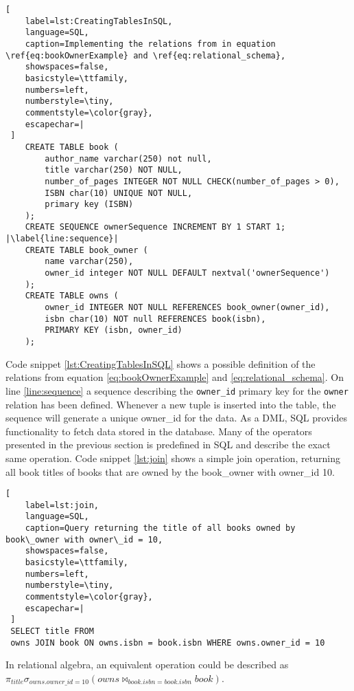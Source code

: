 \begin{lstlisting}[
    label=lst:CreatingTablesInSQL,
    language=SQL,
    caption=Implementing the relations from in equation \ref{eq:bookOwnerExample} and \ref{eq:relational_schema},
    showspaces=false,
    basicstyle=\ttfamily,
    numbers=left,
    numberstyle=\tiny,
    commentstyle=\color{gray},
    escapechar=|
 ]
    CREATE TABLE book (
        author_name varchar(250) not null,
        title varchar(250) NOT NULL,
        number_of_pages INTEGER NOT NULL CHECK(number_of_pages > 0),
        ISBN char(10) UNIQUE NOT NULL,
        primary key (ISBN)
    );
    CREATE SEQUENCE ownerSequence INCREMENT BY 1 START 1; |\label{line:sequence}|
    CREATE TABLE book_owner (
        name varchar(250),
        owner_id integer NOT NULL DEFAULT nextval('ownerSequence')
    );
    CREATE TABLE owns (
        owner_id INTEGER NOT NULL REFERENCES book_owner(owner_id),
        isbn char(10) NOT null REFERENCES book(isbn),
        PRIMARY KEY (isbn, owner_id)
    );
\end{lstlisting}

Code snippet \ref{lst:CreatingTablesInSQL} shows a possible definition of the relations from equation \ref{eq:bookOwnerExample} and \ref{eq:relational_schema}.
On line \ref{line:sequence} a sequence describing the \texttt{owner\_id} primary key for the \texttt{owner} relation has been defined.
Whenever a new tuple is inserted into the table, the sequence will generate a unique owner\_id for the data.
As a DML, SQL provides functionality to fetch data stored in the database. 
Many of the operators presented in the previous section is predefined in SQL and describe the exact same operation. 
Code snippet \ref{lst:join} shows a simple join operation, returning all book titles of books that are owned by the book\_owner with owner\_id 10.

\begin{lstlisting}[
    label=lst:join,
    language=SQL,
    caption=Query returning the title of all books owned by book\_owner with owner\_id = 10,
    showspaces=false,
    basicstyle=\ttfamily,
    numbers=left,
    numberstyle=\tiny,
    commentstyle=\color{gray},
    escapechar=|
 ]
 SELECT title FROM
 owns JOIN book ON owns.isbn = book.isbn WHERE owns.owner_id = 10  
\end{lstlisting}

In relational algebra, an equivalent operation could be described as \\$\pi_{title}\sigma_{owns.owner\_id = 10}(owns \Join_{book.isbn = book.isbn} book )$.

